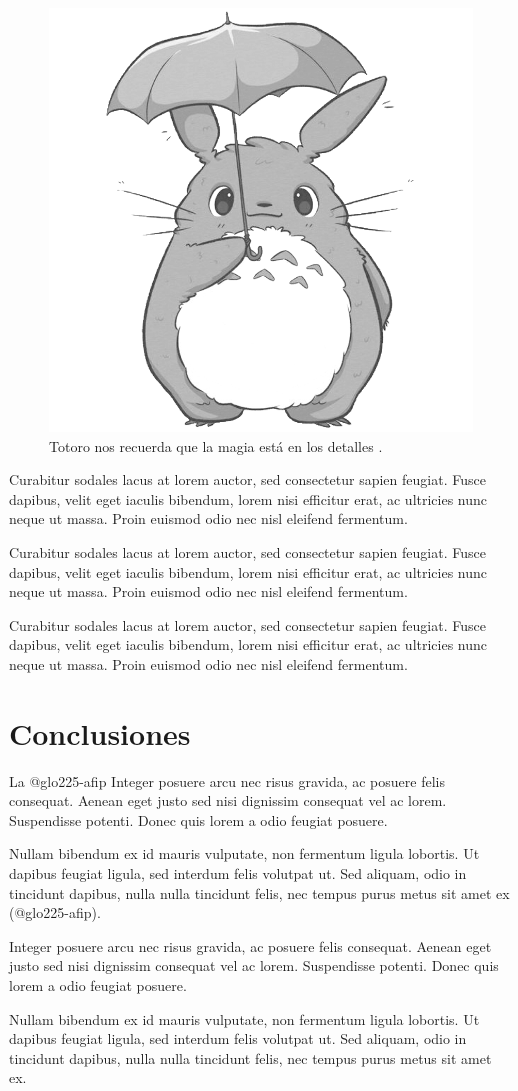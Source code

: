 			\else
			\ifHTMLEPUB
			\begin{figure}[!ht]
			\includegraphics[width=.5\textwidth]{./media/avatar2.png}
			\caption{Totoro nos recuerda que la magia está en los detalles \parencite{@6404-HAYAO2005}.}\label{figura3-1}
			\end{figure}
			\fi
		\fi
	\fi
\fi

Curabitur sodales lacus at lorem auctor, sed consectetur sapien feugiat. Fusce dapibus, velit eget iaculis bibendum, lorem nisi efficitur erat, ac ultricies nunc neque ut massa. Proin euismod odio nec nisl eleifend fermentum.

Curabitur sodales lacus at lorem auctor, sed consectetur sapien feugiat. Fusce dapibus, velit eget iaculis bibendum, lorem nisi efficitur erat, ac ultricies nunc neque ut massa. Proin euismod odio nec nisl eleifend fermentum.

Curabitur sodales lacus at lorem auctor, sed consectetur sapien feugiat. Fusce dapibus, velit eget iaculis bibendum, lorem nisi efficitur erat, ac ultricies nunc neque ut massa. Proin euismod odio nec nisl eleifend fermentum.

\section{Conclusiones}

La \gls{@glo225-afip} Integer posuere arcu nec risus gravida, ac posuere felis consequat. Aenean eget justo sed nisi dignissim consequat vel ac lorem. Suspendisse potenti. Donec quis lorem a odio feugiat posuere.

Nullam bibendum ex id mauris vulputate, non fermentum ligula lobortis. Ut dapibus feugiat ligula, sed interdum felis volutpat ut. Sed aliquam, odio in tincidunt dapibus, nulla nulla tincidunt felis, nec tempus purus metus sit amet ex (\gls{@glo225-afip}).


Integer posuere arcu nec risus gravida, ac posuere felis consequat. Aenean eget justo sed nisi dignissim consequat vel ac lorem. Suspendisse potenti. Donec quis lorem a odio feugiat posuere.

Nullam bibendum ex id mauris vulputate, non fermentum ligula lobortis. Ut dapibus feugiat ligula, sed interdum felis volutpat ut. Sed aliquam, odio in tincidunt dapibus, nulla nulla tincidunt felis, nec tempus purus metus sit amet ex.

\ifPDF
{}
\fi
